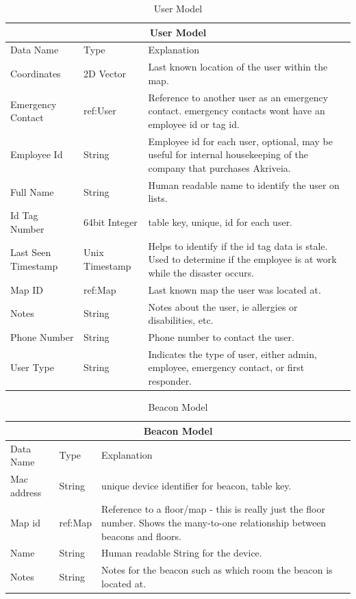 \begin{table}[H]
\centering
\begin{tabular}{| m{3cm} | m{3cm} | m{9.5cm} |}
	\hline
	\multicolumn{3}{|c|}{User Model} \\
	\hline
	Data Name & Type & Explanation \\

	\hline
	Coordinates & 2D Vector & Last known location of the user within the map. \\
	\hline
	Emergency Contact & ref:User & Reference to another user as an emergency contact. emergency contacts wont have an employee id or tag id. \\
	\hline
	Employee Id & String & Employee id for each user, optional, may be useful for internal housekeeping of the company that purchases Akriveia. \\
	\hline
	Full Name & String & Human readable name to identify the user on lists. \\
	\hline
	Id Tag Number & 64bit Integer & table key, unique, id for each user. \\
	\hline
	Last Seen Timestamp & Unix Timestamp & Helps to identify if the id tag data is stale. Used to determine if the employee is at work while the disaster occurs. \\
	\hline
	Map ID & ref:Map & Last known map the user was located at. \\
	\hline
	Notes & String & Notes about the user, ie allergies or disabilities, etc. \\
	\hline
	Phone Number & String & Phone number to contact the user. \\
	\hline
	User Type & String & Indicates the type of user, either admin, employee, emergency contact, or first responder. \\
	\hline
\end{tabular}
\caption{User Model}
\label{user_model}
\end{table}

\begin{table}[H]
\centering
\begin{tabular}{ | m{3cm} | m{3cm} | m{9.5cm} |}
	\hline
	\multicolumn{3}{|c|}{Beacon Model} \\
	\hline
	Data Name & Type & Explanation \\

	\hline
	Mac address & String & unique device identifier for beacon, table key.\\
	\hline
	Map id & ref:Map & Reference to a floor/map - this is really just the floor number. Shows the many-to-one relationship between beacons and floors. \\
	\hline
	Name & String & Human readable String for the device. \\
	\hline
	Notes & String & Notes for the beacon such as which room the beacon is located at. \\
	\hline
\end{tabular}
\caption{Beacon Model}
\label{beacon_model}
\end{table}

